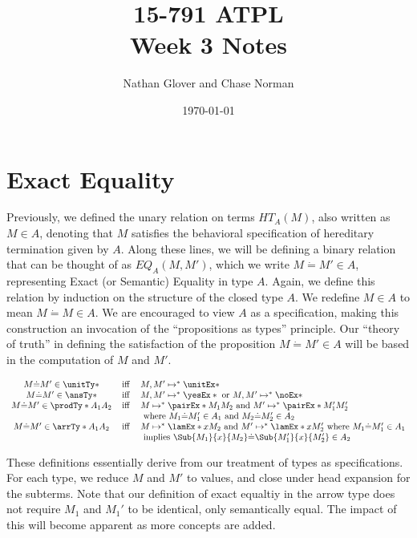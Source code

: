 \documentclass[letterpaper]{article}
\title{15-791 ATPL \\ Week 3 Notes}
\author{Nathan Glover and Chase Norman}
\date{\today}
\begin{document}
\maketitle

\section{Exact Equality}

Previously, we defined the unary relation on terms $HT_A(M)$, also written as $M \in A$, denoting that $M$ satisfies the behavioral specification of hereditary termination given by $A$.
Along these lines, we will be defining a binary relation that can be thought of as $EQ_A(M, M')$, which we write $M \dot{=} M' \in A$, representing Exact (or Semantic) Equality in type $A$.
Again, we define this relation by induction on the structure of the closed type $A$. We redefine $M \in A$ to mean $M \dot{=} M \in A$. 
We are encouraged to view $A$ as a specification, making this construction an invocation of the ``propositions as types'' principle. 
Our ``theory of truth'' in defining the satisfaction of the proposition $M \dot{=} M' \in A$ will be based in the computation of $M$ and $M'$. 

\begin{definition}
    $$
  \begin{array}{cll}
      M \dot{=} M' \in \unitTy* & \Iff & M, M' \mapsto^* \unitEx* \\
      M \dot{=} M' \in \ansTy* & \Iff & M, M' \mapsto^* \yesEx* \text{ or } M, M' \mapsto^* \noEx* \\
      M \dot{=} M' \in \prodTy*{A_1}{A_2} & \Iff &
         M \mapsto^* \pairEx*{M_1}{M_2} \text{ and } M' \mapsto^* \pairEx*{M_1'}{M_2'}\\ & & \text{ where } M_1 \dot{=} M_1' \in A_1 \text{ and } M_2 \dot{=} M_2' \in A_2 \\
      M \dot{=} M' \in \arrTy*{A_1}{A_2} & \Iff & M \mapsto^* \lamEx*{x}{M_2} \text{ and } M' \mapsto^* \lamEx*{x}{M_2'} \text{ where } M_1 \dot{=} M_1' \in A_1 \\ & & 
         \text{ implies } \Sub{M_1}{x}{M_2} \dot{=} \Sub{M_1'}{x}{M_2'} \in A_2 \\
  \end{array}
  $$
\end{definition}

These definitions essentially derive from our treatment of types as specifications. For each type, we reduce $M$ and $M'$ to values, and close under head expansion for the subterms. 
Note that our definition of exact equaltiy in the arrow type does not require $M_1$ and $M_1'$ to be identical, only semantically equal. 
The impact of this will become apparent as more concepts are added.
\end{document}
